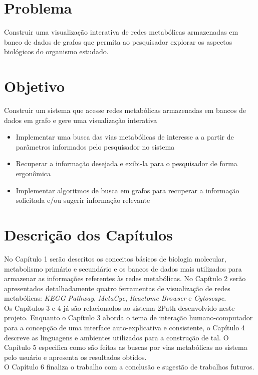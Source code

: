 \section{Problema}
\indent Construir uma visualização interativa de redes metabólicas armazenadas em banco de dados de grafos que permita ao pesquisador explorar os aspectos biológicos do organismo estudado.

\section{Objetivo}
\indent Construir um sistema que acesse redes metabólicas armazenadas em bancos de dados em grafo e gere uma visualização interativa
\begin{itemize}
 \item Implementar uma busca das vias metabólicas de interesse a a partir de parâmetros informados pelo pesquisador no sistema
 \item Recuperar a informação desejada e exibi-la para o pesquisador de forma ergonômica
 \item Implementar algoritmos de busca em grafos para recuperar a informação solicitada e/ou sugerir informação relevante
\end{itemize}

\section{Descrição dos Capítulos}
\indent No Capítulo 1 serão descritos os conceitos básicos de biologia molecular, metabolismo primário e secundário e os bancos de dados mais utilizados para armazenar as informações referentes às redes metabólicas. No Capítulo 2 serão apresentados detalhadamente quatro ferramentas de visualização de redes metabólicas: \textit{KEGG Pathway}, \textit{MetaCyc}, \textit{Reactome Browser} e \textit{Cytoscape}. \\ 
\indent Os Capítulos 3 e 4 já são relacionados ao sistema 2Path desenvolvido neste projeto. Enquanto o Capítulo 3 aborda o tema de interação humano-computador para a concepção de uma interface auto-explicativa e consistente, o Capítulo 4 descreve as linguagens e ambientes utilizados para a construção de tal. O Capítulo 5 especifica como são feitas as buscas por vias metabólicas no sistema pelo usuário e apresenta os resultados obtidos. \\
\indent O Capítulo 6 finaliza o trabalho com a conclusão e sugestão de trabalhos futuros.
